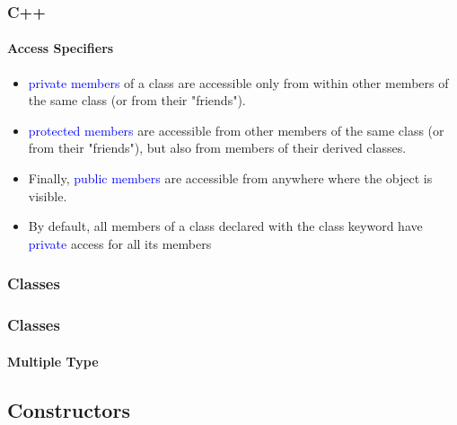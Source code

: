 \documentclass[hyperref={pdfpagelabels=true}]{beamer}
\newcounter{angle}
\begin{document}
\begin{frame}
\frametitle{C++}
\framesubtitle{Access Specifiers}
\begin{itemize}[<+->]
\item \textcolor{blue}{private members} of a class are accessible only from within other members of the same class (or from their "friends").
\item  \textcolor{blue}{protected members} are accessible from other members of the same class (or from their "friends"), but also from members of their derived classes.
\item Finally,  \textcolor{blue}{public members} are accessible from anywhere where the object is visible.
\item By default, all members of a class declared with the class keyword have  \textcolor{blue}{private} access for all its members
\end{itemize}

\end{frame}


\begin{frame}[shrink]
\frametitle{Classes}
\begin{tcolorbox}[title= ,width=9.85 cm]
\scriptsize

\end{tcolorbox}
\end{frame}


\begin{frame}[shrink]
\frametitle{Classes}
\framesubtitle{Multiple Type}
\end{frame}

\subsection{Constructors}
\end{document}

